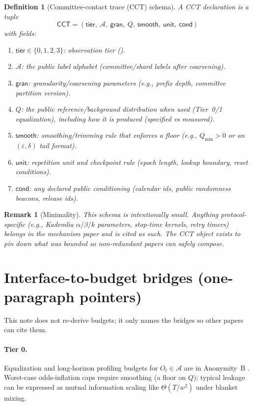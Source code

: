 \documentclass[11pt]{article}
\newtheorem{definition}{Definition}
\newtheorem{remark}{Remark}
\begin{document}
\begin{definition}[Committee-contact trace (CCT) schema]
A CCT declaration is a tuple
\[
\mathsf{CCT} = (\mathsf{tier},\ \mathcal{A},\ \mathsf{gran},\ Q,\ \mathsf{smooth},\ \mathsf{unit},\ \mathsf{cond})
\]
with fields:
\begin{enumerate}[leftmargin=*]
\item $\mathsf{tier}\in\{0,1,2,3\}$: observation tier ().
\item $\mathcal{A}$: the public label alphabet (committee/shard labels after coarsening).
\item $\mathsf{gran}$: granularity/coarsening parameters (e.g., prefix depth, committee partition version).
\item $Q$: the public reference/background distribution when used (Tier~0/1 equalization), including how it is produced (specified vs measured).
\item $\mathsf{smooth}$: smoothing/trimming rule that enforces a floor (e.g., $Q_{\min}>0$ or an $(\varepsilon,\delta)$ tail format).
\item $\mathsf{unit}$: repetition unit and checkpoint rule (epoch length, lookup boundary, reset conditions).
\item $\mathsf{cond}$: any declared public conditioning (calendar ids, public randomness beacons, release ids).
\end{enumerate}
\end{definition}

\begin{remark}[Minimality]
This schema is intentionally small.
Anything protocol-specific (e.g., Kademlia $\alpha/\beta/k$ parameters, stop-time kernels, retry timers) belongs in the mechanism paper and is cited as such.
The CCT object exists to pin down \emph{what was bounded} so non-redundant papers can safely compose.
\end{remark}

\section{Interface-to-budget bridges (one-paragraph pointers)}
This note does not re-derive budgets; it only names the bridges so other papers can cite them.

\paragraph{Tier 0.}
Equalization and long-horizon profiling budgets for $O_t\in\mathcal{A}$ are in Anonymity~B \cite{series:profiling}.
Worst-case odds-inflation caps require smoothing (a floor on $Q$); typical leakage can be expressed as mutual information scaling like $\Theta(T/w^2)$ under blanket mixing.
\end{document}
